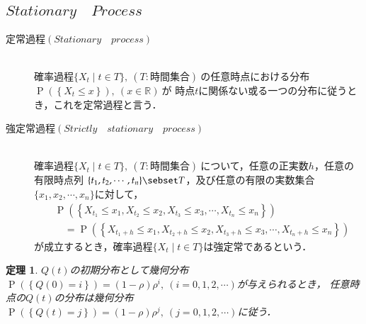 \documentclass[a4j,papersize,disablejfam,slide,14pt]{jsarticle}
\newtheorem{Prop}{定理}
\def\prob#1{\operatorname{P} \left(\left\{ #1 \right\}\right)} %
\begin{document}
\subsection{$Stationary\quad Process$}
	\begin{screen}
    	\begin{description}
        	\item[定常過程$(Stationary\quad process)$]\mbox{}\\
            	確率過程$\{ X_t \mid t \in T \},\ (T:\mbox{時間集合})\ $の任意時点における分布$\prob{X_t \leq x},\ (x \in \mathbb{R})\ $が
                時点$t$に関係ない或る一つの分布に従うとき，これを定常過程と言う．
            \mbox{}\\
            \item[強定常過程$(Strictly\quad stationary\quad process)$]\mbox{}\\
            	確率過程$\{ X_t \mid t \in T \},\ (T:\mbox{時間集合})\ $について，任意の正実数$h$，任意の有限時点列
                $\{t_1, t_2, \cdots ,t_n\} \sebset T$，及び任意の有限の実数集合$\{x_1, x_2, \cdots ,x_n\}$に対して，
                \begin{align}
                	&\prob{X_t_1 \leq x_1, X_t_2 \leq x_2, X_t_3 \leq x_3, \cdots,X_t_n \leq x_n} \\
                    &\quad= \prob{X_{t_1+h} \leq x_1, X_{t_2+h} \leq x_2, X_{t_3+h} \leq x_3, \cdots,X_{t_n+h} \leq x_n}
                \end{align}
                が成立するとき，確率過程$\{ X_t \mid t \in T \}$は強定常であるという．
        \end{description}
    \end{screen}
	\begin{screen}
    	\begin{Prop}
    		$Q(t)$の初期分布として幾何分布$\prob{Q(0)=i}=(1-\rho)\rho^i,\ (i=0,1,2,\cdots)$が与えられるとき，
        	任意時点の$Q(t)$の分布は幾何分布$\prob{Q(t)=j}=(1-\rho)\rho^j,\ (j=0,1,2,\cdots)$に従う．
    	\end{Prop}
    \end{screen}
\end{document}
